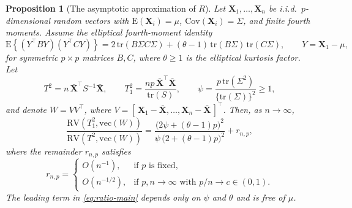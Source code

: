 \documentclass[12pt]{article}
\theoremstyle{remark}
\theoremstyle{plain}
\newtheorem{proposition}{Proposition}[section]
\begin{document}
\begin{proposition} [The asymptotic approximation of $R$]
	\label{thm:ratio}
	Let $\mathbf{X}_{1},\ldots,\mathbf{X}_{n}$ be i.i.d.\ $p$-dimensional random vectors with 
	$\mathrm{E}(\mathbf{X}_{i})=\mu$, $\mathrm{Cov}(\mathbf{X}_{i})=\Sigma$, and finite fourth moments. 
	Assume the elliptical fourth-moment identity
	\begin{equation}
		\mathrm{E}\!\left\{ (Y^\top B Y)(Y^\top C Y) \right\}
		= 2\,\mathrm{tr}(B\Sigma C\Sigma) + (\theta-1)\,\mathrm{tr}(B\Sigma)\,\mathrm{tr}(C\Sigma),
		\qquad Y=\mathbf{X}_1-\mu,
		\label{eq:elliptical-identity}
	\end{equation}
	for symmetric $p\times p$ matrices $B,C$, where $\theta\ge 1$ is the elliptical kurtosis factor. 
	Let
	\[
	T^{2}=n\,\bar{\mathbf{X}}^{\top} S^{-1}\bar{\mathbf{X}}, 
	\qquad 
	T_{1}^{2}=\frac{n p\,\bar{\mathbf{X}}^{\top}\bar{\mathbf{X}}}{\mathrm{tr}(S)},
	\qquad
	\psi=\frac{p\,\mathrm{tr}(\Sigma^2)}{\{\mathrm{tr}(\Sigma)\}^{2}}\ge 1,
	\]
	and denote $W=VV^\top$, where $V=[\,\mathbf{X}_{1}-\bar{\mathbf{X}},\ldots,\mathbf{X}_{n}-\bar{\mathbf{X}}\,]^{\top}$. 
	Then, as $n\to\infty$,
	\begin{equation}
		\frac{\mathrm{RV}(T_1^2,\mathrm{vec}(W))}{\mathrm{RV}(T^2,\mathrm{vec}(W))}
		=\frac{\big(2\psi+(\theta-1)p\big)^2}{\psi\,\big(2+(\theta-1)p\big)^2} + r_{n,p},
		\label{eq:ratio-main}
	\end{equation}
	where the remainder $r_{n,p}$ satisfies
	\[
	r_{n,p}=
	\begin{cases}
		O(n^{-1}), & \text{if $p$ is fixed}, \\[0.5ex]
		O(n^{-1/2}), & \text{if $p,n\to\infty$ with $p/n\to c\in(0,1)$}.
	\end{cases}
	\]
	The leading term in \eqref{eq:ratio-main} depends only on $\psi$ and $\theta$ and is free of $\mu$.
\end{proposition}
\end{document}
